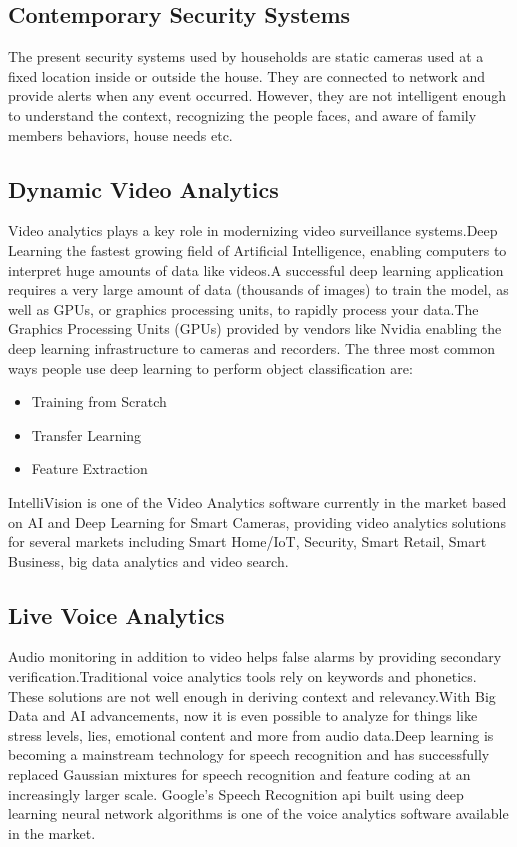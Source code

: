 \documentclass[sigconf]{acmart}
\begin{document}
\subsection{Contemporary Security Systems}

The present security systems used by households are static cameras used at a fixed location inside or outside the house. They are connected to network and provide alerts when any event occurred. However, they are not intelligent enough to understand the context, recognizing the people faces, and aware of family members behaviors, house needs etc.

\subsection{Dynamic Video Analytics}

Video analytics plays a key role in modernizing video surveillance systems.Deep Learning the fastest growing field of Artificial Intelligence, enabling computers to interpret huge 
amounts of data like videos.A successful deep learning application requires a very large amount of data (thousands of images) to train the model, as well as GPUs, or graphics processing units, to rapidly process your data.The Graphics Processing Units (GPUs) provided by vendors like Nvidia enabling the deep learning infrastructure to cameras and recorders. The three most common ways people use deep learning to perform object classification are:

\begin{itemize}
 \item Training from Scratch
 \item Transfer Learning
 \item Feature Extraction
\end{itemize}

IntelliVision is one of the Video Analytics software currently in the market based on AI and Deep Learning for Smart Cameras, providing video analytics solutions for several markets including Smart Home/IoT, Security, Smart Retail, Smart Business, big data analytics and video search. 

\subsection{Live Voice Analytics}
Audio monitoring in addition to video helps false alarms by providing secondary verification.Traditional voice analytics tools rely on keywords and phonetics. These solutions are not well enough in deriving context and relevancy.With Big Data and AI advancements, now it is even possible to analyze for things like stress levels, lies, emotional content and more from audio data.Deep learning is becoming a mainstream technology for speech recognition and has successfully replaced  Gaussian  mixtures  for  speech  recognition  and  feature  coding  at  an  increasingly  larger scale. Google's Speech Recognition api  built using deep learning neural network algorithms is one of the voice analytics software available in the market.
\end{document}
